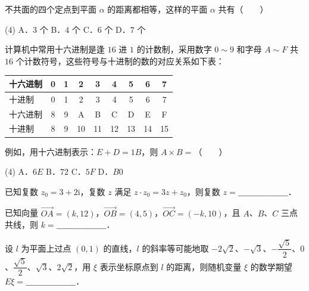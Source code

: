 \begin{question}
不共面的四个定点到平面 $\alpha$ 的距离都相等，这样的平面 $\alpha$ 共有\mbox{（　　）}

\begin{gkopts}(4)
\task A．$3$ 个
\task B．$4$ 个
\task C．$6$ 个
\task D．$7$ 个
\end{gkopts}

\end{question}
\begin{question}
计算机中常用十六进制是逢 $16$ 进 $1$ 的计数制，采用数字 $0 \sim 9$ 和字母 $A \sim F$ 共 $16$ 个计数符号，这些符号与十进制的数的对应关系如下表：

\begin{center}
\begingroup\setlength{\tabcolsep}{4pt}
\begin{tabular}{lcccccccc}
\toprule
十六进制 & 0 & 1 & 2 & 3 & 4 & 5 & 6 & 7 \\
\midrule
十进制 & 0 & 1 & 2 & 3 & 4 & 5 & 6 & 7 \\
十六进制 & 8 & 9 & A & B & C & D & E & F \\
十进制 & 8 & 9 & 10 & 11 & 12 & 13 & 14 & 15 \\
\bottomrule
\end{tabular}
\endgroup
\end{center}

例如，用十六进制表示：$E + D = 1B$，则 $A \times B =$\mbox{（　　）}

\begin{gkopts}(4)
\task A．$6E$
\task B．$72$
\task C．$5F$
\task D．$B0$
\end{gkopts}

\end{question}
\begin{question}
已知复数 $z_0 = 3 + 2\mathrm{i}$，复数 $z$ 满足 $z \cdot z_0 = 3z + z_0$，则复数 $z =$＿＿＿＿＿＿．

\end{question}
\begin{question}
已知向量 $\overrightarrow{OA} = (k, 12)$，$\overrightarrow{OB} = (4, 5)$，$\overrightarrow{OC} = (-k, 10)$，且 $A$、$B$、$C$ 三点共线，则 $k =$＿＿＿＿＿＿．

\end{question}
\begin{question}
设 $l$ 为平面上过点 $(0, 1)$ 的直线，$l$ 的斜率等可能地取 $-2\sqrt{2}$、$-\sqrt{3}$、$-\dfrac{\sqrt{5}}{2}$、$0$、$\dfrac{\sqrt{5}}{2}$、$\sqrt{3}$、$2\sqrt{2}$，用 $\xi$ 表示坐标原点到 $l$ 的距离，则随机变量 $\xi$ 的数学期望 $E\xi =$＿＿＿＿＿＿．

\end{question}
